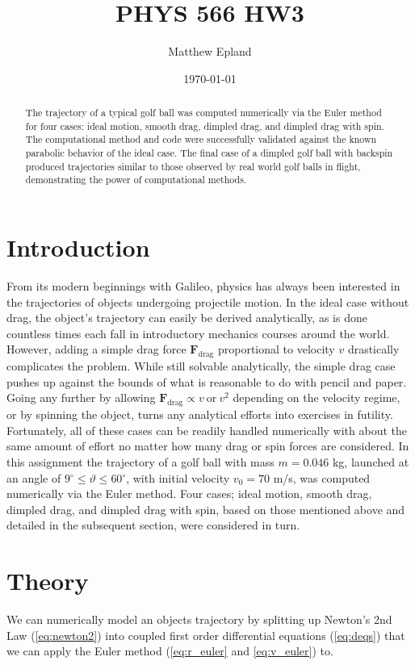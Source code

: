 \documentclass[notitlepage,aps,prd,nofootinbib]{revtex4-1}
\newcommand{\degree}{\ensuremath{^{\circ}}}
\begin{document}
\title{PHYS 566 HW3}
\author{Matthew Epland}

\date{\today}

\begin{abstract}
The trajectory of a typical golf ball was computed numerically via the Euler method for four cases: ideal motion, smooth drag, dimpled drag, and dimpled drag with spin. The computational method and code were successfully validated against the known parabolic behavior of the ideal case. The final case of a dimpled golf ball with backspin produced trajectories similar to those observed by real world golf balls in flight, demonstrating the power of computational methods.
\end{abstract}\maketitle


\section{Introduction}
\label{sec:intro}
From its modern beginnings with Galileo, physics has always been interested in the trajectories of objects undergoing projectile motion. In the ideal case without drag, the object's trajectory can easily be derived analytically, as is done countless times each fall in introductory mechanics courses around the world. However, adding a simple drag force $\mathbf{F}_{\text{drag}}$ proportional to velocity $v$ drastically complicates the problem. While still solvable analytically, the simple drag case pushes up against the bounds of what is reasonable to do with pencil and paper. Going any further by allowing $\mathbf{F}_{\text{drag}} \propto v~\text{or}~v^2$ depending on the velocity regime, or by spinning the object, turns any analytical efforts into exercises in futility. Fortunately, all of these cases can be readily handled numerically with about the same amount of effort no matter how many drag or spin forces are considered.
In this assignment the trajectory of a golf ball with mass $m = 0.046$ kg, launched at an angle of $9\degree \leq \vartheta \leq 60\degree$, with initial velocity $v_{0} = 70 $ m/s, was computed numerically via the Euler method. Four cases; ideal motion, smooth drag, dimpled drag, and dimpled drag with spin, based on those mentioned above and detailed in the subsequent section, were considered in turn.
\section{Theory}
\label{sec:theory}
We can numerically model an objects trajectory by splitting up Newton's 2nd Law (\ref{eq:newton2}) into coupled first order differential equations (\ref{eq:deqs}) that we can apply the Euler method (\ref{eq:r_euler} and \ref{eq:v_euler}) to.
\end{document}
